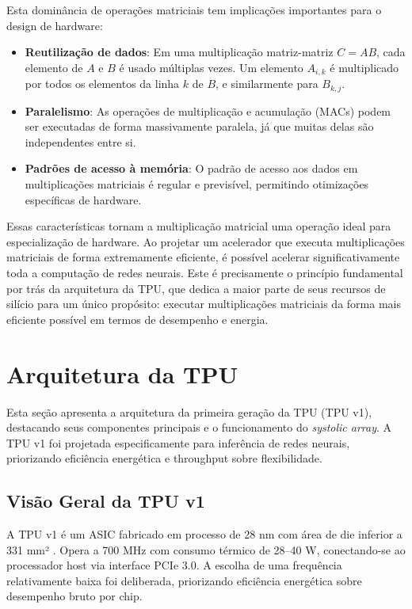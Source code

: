 \documentclass[12pt,a4paper]{article}
\begin{document}
Esta dominância de operações matriciais tem implicações importantes para o design de hardware:

\begin{itemize}
\item \textbf{Reutilização de dados}: Em uma multiplicação matriz-matriz $C = AB$, cada elemento de $A$ e $B$ é usado múltiplas vezes. Um elemento $A_{i,k}$ é multiplicado por todos os elementos da linha $k$ de $B$, e similarmente para $B_{k,j}$.

\item \textbf{Paralelismo}: As operações de multiplicação e acumulação (MACs) podem ser executadas de forma massivamente paralela, já que muitas delas são independentes entre si.

\item \textbf{Padrões de acesso à memória}: O padrão de acesso aos dados em multiplicações matriciais é regular e previsível, permitindo otimizações específicas de hardware.
\end{itemize}

Essas características tornam a multiplicação matricial uma operação ideal para especialização de hardware. Ao projetar um acelerador que executa multiplicações matriciais de forma extremamente eficiente, é possível acelerar significativamente toda a computação de redes neurais. Este é precisamente o princípio fundamental por trás da arquitetura da TPU, que dedica a maior parte de seus recursos de silício para um único propósito: executar multiplicações matriciais da forma mais eficiente possível em termos de desempenho e energia.

\section{Arquitetura da TPU}

Esta seção apresenta a arquitetura da primeira geração da TPU (TPU v1), destacando seus componentes principais e o funcionamento do \textit{systolic array}. A TPU v1 foi projetada especificamente para inferência de redes neurais, priorizando eficiência energética e throughput sobre flexibilidade.

\subsection{Visão Geral da TPU v1}

A TPU v1 é um ASIC fabricado em processo de 28 nm com área de die inferior a 331 mm² \cite{wikipedia_tpu_2024}. Opera a 700 MHz com consumo térmico de 28--40 W, conectando-se ao processador host via interface PCIe 3.0. A escolha de uma frequência relativamente baixa foi deliberada, priorizando eficiência energética sobre desempenho bruto por chip.
\end{document}
